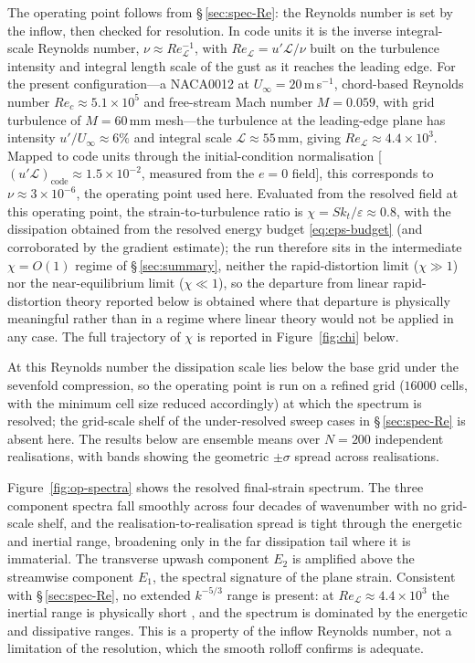 \documentclass[lineno]{JFM-FLM_Au}
\begin{document}
The operating point follows from \S\,\ref{sec:spec-Re}: the Reynolds number is
set by the inflow, then checked for resolution. In code units it is the inverse
integral-scale Reynolds number, $\nu\approx Re_{\mathcal{L}}^{-1}$, with
$Re_{\mathcal{L}}=u'\mathcal{L}/\nu$ built on the turbulence intensity and
integral length scale of the gust as it reaches the leading edge. For the
present configuration---a NACA0012 at $U_\infty=20$\,m\,s$^{-1}$, chord-based
Reynolds number $Re_c\approx5.1\times10^5$ and free-stream Mach number
$M=0.059$, with grid turbulence of $M=60$\,mm mesh---the turbulence at the
leading-edge plane has intensity $u'/U_\infty\approx6\%$ and integral scale
$\mathcal{L}\approx55$\,mm, giving $Re_{\mathcal{L}}\approx4.4\times10^3$.
Mapped to code units through the initial-condition normalisation
[$(u'\mathcal{L})_{\mathrm{code}}\approx1.5\times10^{-2}$, measured from the
$e=0$ field], this corresponds to $\nu\approx3\times10^{-6}$, the operating
point used here. Evaluated from the resolved field at this operating point, the
strain-to-turbulence ratio is $\chi=Sk_t/\varepsilon\approx0.8$, with the
dissipation obtained from the resolved energy budget \eqref{eq:eps-budget}
(and corroborated by the gradient estimate); the run therefore sits in the intermediate
$\chi=O(1)$ regime of
\S\,\ref{sec:summary}, neither the rapid-distortion limit ($\chi\gg1$) nor the
near-equilibrium limit ($\chi\ll1$), so the departure from linear
rapid-distortion theory reported below is obtained where that departure is
physically meaningful rather than in a regime where linear theory would not be
applied in any case. The full trajectory of $\chi$ is reported in
Figure~\ref{fig:chi} below.

At this Reynolds number the dissipation scale lies below the base grid under
the sevenfold compression, so the operating point is run on a refined grid
($16000$ cells, with the minimum cell size reduced accordingly) at which the
spectrum is resolved; the grid-scale shelf of the under-resolved sweep cases in
\S\,\ref{sec:spec-Re} is absent here. The results below are ensemble means over
$N=200$ independent realisations, with bands showing the geometric $\pm\sigma$
spread across realisations.

Figure~\ref{fig:op-spectra} shows the resolved final-strain spectrum. The three
component spectra fall smoothly across four decades of wavenumber with no
grid-scale shelf, and the realisation-to-realisation spread is tight through the
energetic and inertial range, broadening only in the far dissipation tail where
it is immaterial. The transverse upwash component $E_2$ is amplified above the
streamwise component $E_1$, the spectral signature of the plane strain.
Consistent with \S\,\ref{sec:spec-Re}, no extended $k^{-5/3}$ range is present:
at $Re_{\mathcal{L}}\approx4.4\times10^3$ the inertial range is physically short
\citep{Pope2000}, and the spectrum is dominated by the energetic and dissipative
ranges. This is a property of the inflow Reynolds number, not a limitation of
the resolution, which the smooth rolloff confirms is adequate.
\end{document}
